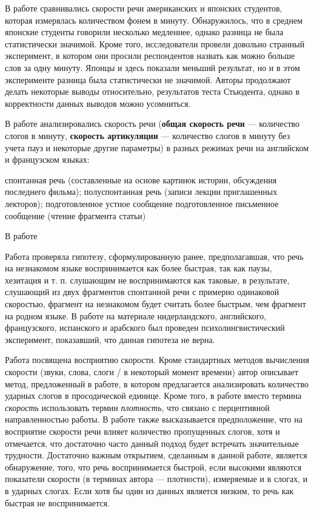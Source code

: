 \par В работе \citep{osser64}  сравнивались скорости речи американских и японских студентов, которая измерялась количеством фонем в минуту. Обнаружилось, что в среднем японские студенты говорили несколько медленнее, однако разница не была статистически значимой. Кроме того, исследователи провели довольно странный эксперимент, в котором они просили респондентов назвать как можно больше слов за одну минуту. Японцы и здесь показали меньший результат, но и в этом эксперименте разница была статистически не значимой. Авторы продолжают делать некоторые выводы относительно, результатов теста Стьюдента, однако в корректности данных выводов можно усомниться.
\par В работе \citep{barik77} анализировались скорость речи (\textbf{общая скорость речи} --- количество слогов в минуту, \textbf{скорость артикуляции} --- количество слогов в минуту без учета пауз и некоторые другие параметры) в разных режимах речи на английском и французском языках:
\begin{itemize}
\mytem спонтанная речь (составленные на основе картинок истории, обсуждения последнего фильма);
\mytem полуспонтанная речь (записи лекции приглашенных лекторов);
\mytem подготовленное устное сообщение 
\mytem подготовленное письменное сообщение (чтение фрагмента статьи)
\end{itemize}
\par В работе \citep{scollon81}
\par Работа \citep{vaane82} проверяла гипотезу, сформулированную ранее, предполагавшая, что речь на незнакомом языке воспринимается как более быстрая, так как паузы, хезитация и т. п. слушающим не воспринимаются как таковые, в результате, слушающий из двух фрагментов спонтанной речи с примерно одинаковой скоростью, фрагмент на незнакомом будет считать более быстрым, чем фрагмент на родном языке. В работе \citep{vaane82} на материале нидерландского, английского, французского, испанского и арабского был проведен психолингвистический эксперимент, показавший, что данная гипотеза не верна.
\par Работа \citep{uhmann92} посвящена восприятию скорости. Кроме стандартных методов вычисления скорости (звуки, слова, слоги / в некоторый момент времени) автор описывает метод, предложенный в работе, в котором предлагается анализировать количество ударных слогов в просодической единице. Кроме того, в работе вместо термина \textit{скорость} использовать термин \textit{плотность}, что связано с перцептивной направленностью работы. В работе также высказывается предположение, что на восприятие скорости речи влияет количество пропущенных слогов, хотя и отмечается, что достаточно часто данный подход будет встречать значительные трудности. Достаточно важным открытием, сделанным в данной работе, является обнаружение, того, что речь воспринимается быстрой, если высокими являются показатели скорости (в терминах автора --- плотности), измеряемые и в слогах, и в ударных слогах. Если хотя бы один из данных является низким, то речь как быстрая не воспринимается.
